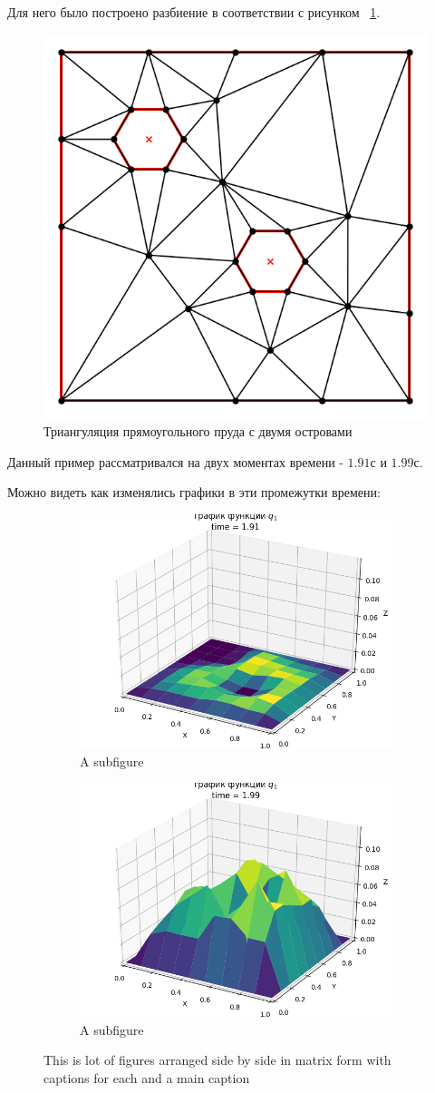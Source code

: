\documentclass[14pt]{extreport}
\begin{document}
Для него было построено разбиение в соответствии с рисунком ~\ref{img:ex3:mesh}.

\begin{figure}[H]
\centerline{
\includegraphics[width=0.5\linewidth]{images/ex3/mesh}}
\caption{Триангуляция прямоугольного пруда с двумя островами}
\label{img:ex3:mesh}
\end{figure}

Данный пример рассматривался на двух моментах времени - $1.91$с и $1.99$с.

Можно видеть как изменялись графики в эти промежутки времени:


\begin{figure}[htb]
\centering
  \begin{subfigure}[b]{.24\linewidth}
    \centering
    \includegraphics[width=0.5\linewidth]{images/ex3/q_1/91}
    \caption{A subfigure}\label{img:ex3:q1:91}
  \end{subfigure}%
  \begin{subfigure}[b]{.24\linewidth}
    \centering
    \includegraphics[width=0.5\linewidth]{images/ex3/q_1/99}
    \caption{A subfigure}\label{img:ex3:q1:99}
  \end{subfigure}%
  \caption{This is   lot of figures arranged side by side in matrix form with captions for each and a main caption}\label{fig:1}
\end{figure}
\end{document}
